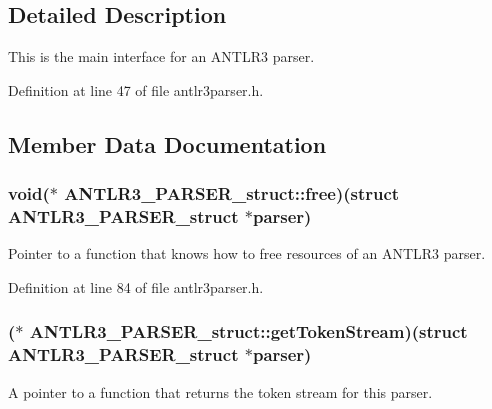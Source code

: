 \subsection{Detailed Description}
This is the main interface for an A\-N\-T\-L\-R3 parser. 

Definition at line 47 of file antlr3parser.\-h.



\subsection{Member Data Documentation}
\hypertarget{struct_a_n_t_l_r3___p_a_r_s_e_r__struct_ab7b448ec3407ffbf9315c73318d8886f}{
\subsubsection[{free}]{\setlength{\rightskip}{0pt plus 5cm}void($\ast$ A\-N\-T\-L\-R3\-\_\-\-P\-A\-R\-S\-E\-R\-\_\-struct\-::free)(struct {\bf A\-N\-T\-L\-R3\-\_\-\-P\-A\-R\-S\-E\-R\-\_\-struct} $\ast$parser)}}\label{struct_a_n_t_l_r3___p_a_r_s_e_r__struct_ab7b448ec3407ffbf9315c73318d8886f}
Pointer to a function that knows how to free resources of an A\-N\-T\-L\-R3 parser. 

Definition at line 84 of file antlr3parser.\-h.

\hypertarget{struct_a_n_t_l_r3___p_a_r_s_e_r__struct_a534c95a165b64e3d53c83de086fbbc4c}{
\subsubsection[{get\-Token\-Stream}]{($\ast$ A\-N\-T\-L\-R3\-\_\-\-P\-A\-R\-S\-E\-R\-\_\-struct\-::get\-Token\-Stream)(struct {\bf A\-N\-T\-L\-R3\-\_\-\-P\-A\-R\-S\-E\-R\-\_\-struct} $\ast$parser)}}\label{struct_a_n_t_l_r3___p_a_r_s_e_r__struct_a534c95a165b64e3d53c83de086fbbc4c}
A pointer to a function that returns the token stream for this parser. 

